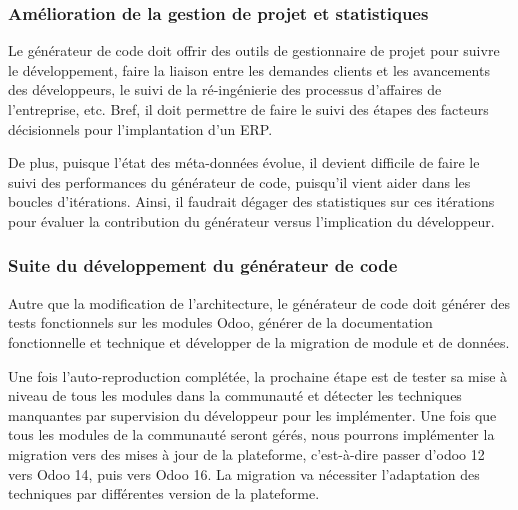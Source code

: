 \subsubsection{Amélioration de la gestion de projet et statistiques}

Le générateur de code doit offrir des outils de gestionnaire de projet pour suivre le développement, faire la liaison entre les demandes clients et les avancements des développeurs, le suivi de la ré-ingénierie des processus d'affaires de l'entreprise, etc. Bref, il doit permettre de faire le suivi des étapes des facteurs décisionnels pour l'implantation d'un ERP.

De plus, puisque l’état des méta-données évolue, il devient difficile de faire le suivi des performances du générateur de code, puisqu’il vient aider dans les boucles d’itérations. Ainsi, il faudrait dégager des statistiques sur ces itérations pour évaluer la contribution du générateur versus l'implication du développeur.


\subsubsection{Suite du développement du générateur de code}

Autre que la modification de l'architecture, le générateur de code doit générer des tests fonctionnels sur les modules Odoo, générer de la documentation fonctionnelle et technique et développer de la migration de module et de données.


Une fois l'auto-reproduction complétée, la prochaine étape est de tester sa mise à niveau de tous les modules dans la communauté et détecter les techniques manquantes par supervision du développeur pour les implémenter. Une fois que tous les modules de la communauté seront gérés, nous pourrons implémenter la migration vers des mises à jour de la plateforme, c’est-à-dire passer d'odoo 12 vers Odoo 14, puis vers Odoo 16. La migration va nécessiter l'adaptation des techniques par différentes version de la plateforme.


